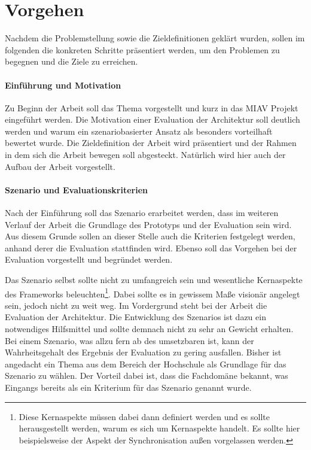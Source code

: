 \documentclass[11pt,headsepline,a4paper,bibtotoc,liststotoc,DIV12,BCOR12mm]{scrartcl}
\begin{document}

\section{Vorgehen} %
\label{sec:vorgehen}

  Nachdem die Problemstellung sowie die Zieldefinitionen geklärt wurden, sollen im folgenden die konkreten Schritte präsentiert werden, um den Problemen zu begegnen und die Ziele zu erreichen.

\paragraph{Einführung und Motivation} %
\label{par:einfuehrung}
  
  Zu Beginn der Arbeit soll das Thema vorgestellt und kurz in das MIAV Projekt eingeführt werden. Die Motivation einer Evaluation der Architektur soll deutlich werden und warum ein szenariobasierter Ansatz als besonders vorteilhaft bewertet wurde. Die Zieldefinition der Arbeit wird präsentiert und der Rahmen in dem sich die Arbeit bewegen soll abgesteckt. Natürlich wird hier auch der Aufbau der Arbeit vorgestellt.
  

\paragraph{Szenario und Evaluationskriterien} %
\label{par:szenario_und_evaluationskriterien}

  Nach der Einführung soll das Szenario erarbeitet werden, dass im weiteren Verlauf der Arbeit die Grundlage des Prototyps und der Evaluation sein wird. Aus diesem Grunde sollen an dieser Stelle auch die Kriterien festgelegt werden, anhand derer die Evaluation stattfinden wird. Ebenso soll das Vorgehen bei der Evaluation vorgestellt und begründet werden.
  
  Das Szenario selbst sollte nicht zu umfangreich sein und wesentliche Kernaspekte des Frameworks beleuchten\footnote{Diese Kernaspekte müssen dabei dann definiert werden und es sollte herausgestellt werden, warum es sich um Kernaspekte handelt. Es sollte hier beispielsweise der Aspekt der Synchronisation außen vorgelassen werden.}. Dabei sollte es in gewissem Maße visionär angelegt sein, jedoch nicht zu weit weg. Im Vordergrund steht bei der Arbeit die Evaluation der Architektur. Die Entwicklung des Szenarios ist dazu ein notwendiges Hilfsmittel und sollte demnach nicht zu sehr an Gewicht erhalten. Bei einem Szenario, was allzu fern ab des umsetzbaren ist, kann der Wahrheitsgehalt des Ergebnis der Evaluation zu gering ausfallen. Bisher ist angedacht ein Thema aus dem Bereich der Hochschule als Grundlage für das Szenario zu wählen. Der Vorteil dabei ist, dass die Fachdomäne bekannt, was Eingangs bereits als ein Kriterium für das Szenario genannt wurde.
  
\end{document}
